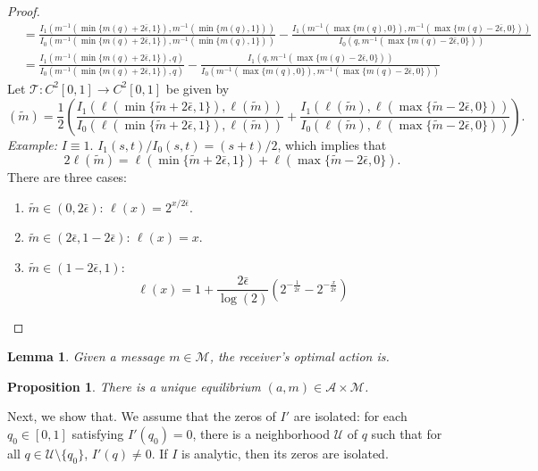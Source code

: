 \documentclass[12pt]{article}
\newtheorem{lemma}{Lemma}
\newtheorem{proposition}{Proposition}
\begin{document}
\begin{proof}
\begin{align}
&=\frac{I_{1}(m^{-1}(\min\{m(q)+2\bar{\epsilon},1\}),m^{-1}(\min\{m(q),1\}))}{I_{0}(m^{-1}(\min\{m(q)+2\bar{\epsilon},1\}),m^{-1}(\min\{m(q),1\}))}-\frac{I_{1}(m^{-1}(\max\{m(q),0\}),m^{-1}(\max\{m(q)-2\bar{\epsilon},0\}))}{I_{0}(q,m^{-1}(\max\{m(q)-2\bar{\epsilon},0\}))}\\
&=\frac{I_{1}(m^{-1}(\min\{m(q)+2\bar{\epsilon},1\}),q)}{I_{0}(m^{-1}(\min\{m(q)+2\bar{\epsilon},1\}),q)}-\frac{I_{1}(q,m^{-1}(\max\{m(q)-2\bar{\epsilon},0\}))}{I_{0}(m^{-1}(\max\{m(q),0\}),m^{-1}(\max\{m(q)-2\bar{\epsilon},0\}))}
\end{align}
Let $\mathcal{T}:C^{2}[0,1]\rightarrow C^{2}[0,1]$ be given by
\begin{equation}
[\mathcal{T}\ell](\tilde{m})=\frac{1}{2}\left(\frac{I_{1}(\ell(\min\{\tilde{m}+2\bar{\epsilon},1\}),\ell(\tilde{m}))}{I_{0}(\ell(\min\{\tilde{m}+2\bar{\epsilon},1\}),\ell(\tilde{m}))}+\frac{I_{1}(\ell(\tilde{m}),\ell(\max\{\tilde{m}-2\bar{\epsilon},0\}))}{I_{0}(\ell(\tilde{m}),\ell(\max\{\tilde{m}-2\bar{\epsilon},0\}))}\right).
\end{equation}
\textit{Example:} $I\equiv1$. $I_{1}(s,t)/I_{0}(s,t)=(s+t)/2$, which implies that
\begin{equation}
2\ell(\tilde{m})=\ell(\min\{\tilde{m}+2\bar{\epsilon},1\})+\ell(\max\{\tilde{m}-2\bar{\epsilon},0\}).
\end{equation}
There are three cases:
\begin{enumerate}
\item $\tilde{m}\in(0,2\bar{\epsilon})$: $\ell(x)=2^{x/2\bar{\epsilon}}$.
\item $\tilde{m}\in(2\bar{\epsilon},1-2\bar{\epsilon})$: $\ell(x)=x$. 
\item $\tilde{m}\in(1-2\bar{\epsilon},1)$: 
\begin{equation}
\ell(x)=1+\frac{2\bar{\epsilon}}{\log(2)}\left(2^{-\frac{1}{2\bar{\epsilon}}}-2^{-\frac{x}{2\bar{\epsilon}}}\right)
\end{equation}
\end{enumerate} 
\end{proof}
\begin{lemma}
Given a message $m\in\mathcal{M}$, the receiver's optimal action is.
\end{lemma}
\begin{proposition}
There is a unique equilibrium $(a,m)\in\mathcal{A}\times\mathcal{M}$. 
\end{proposition}
Next, we show that. We assume that the zeros of $I'$ are isolated: for each $q_{0}\in[0,1]$ satisfying $I'(q_{0})=0$, there is a neighborhood $\mathcal{U}$ of $q$ such that for all $q\in\mathcal{U}\setminus\{q_{0}\}$, $I'(q)\neq0$. If $I$ is analytic, then its zeros are isolated. 
\end{document}
